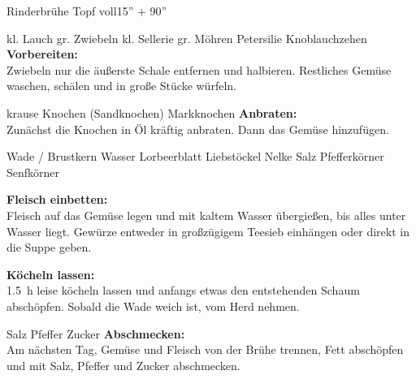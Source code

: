 \begin{MyRecipe}{Rinderbrühe}{ Topf voll}{15'' + 90''}

\ingredient[\Calc{1}{\x}]{} {kl. Lauch}
\ingredient[\Calc{2}{\x}]{} {gr. Zwiebeln}
\ingredient[\Calc{1}{\x}]{} {kl. Sellerie}
\ingredient[\Calc{3}{\x}]{} {gr. Möhren}
 {Petersilie}
\ingredient[\Calc{2}{\x}]{} {Knoblauchzehen}
\textbf{Vorbereiten:}\\
Zwiebeln nur die äußerste Schale entfernen und halbieren. Restliches Gemüse waschen, schälen und in große Stücke würfeln.

 {krause Knochen (Sandknochen)}
 {Markknochen}
\textbf{Anbraten:}\\
Zunächst die Knochen in Öl kräftig anbraten. Dann das Gemüse hinzufügen.

 {Wade / Brustkern}
 {Wasser}
\ingredient[\Calc{1}{\x}]{} {Lorbeerblatt}
 {Liebstöckel}
\ingredient[\Calc{1}{\x}]{} {Nelke}
 {Salz}
 {Pfefferkörner}
 {Senfkörner}

\textbf{Fleisch einbetten:}\\
Fleisch auf das Gemüse legen und mit kaltem Wasser übergießen, bis alles unter Wasser liegt. Gewürze entweder in großzügigem Teesieb einhängen oder direkt in die Suppe geben.

\textbf{Köcheln lassen:}\\
\SI{1,5}{\hour} leise köcheln lassen und anfangs etwas den entstehenden Schaum abschöpfen. Sobald die Wade weich ist, vom Herd nehmen.\par

\ingredient[]{} {Salz}
\ingredient[]{} {Pfeffer}
\ingredient[]{} {Zucker}
\textbf{Abschmecken:}\\
Am nächsten Tag, Gemüse und Fleisch von der Brühe trennen, Fett abschöpfen und mit Salz, Pfeffer und Zucker abschmecken.









\end{MyRecipe}